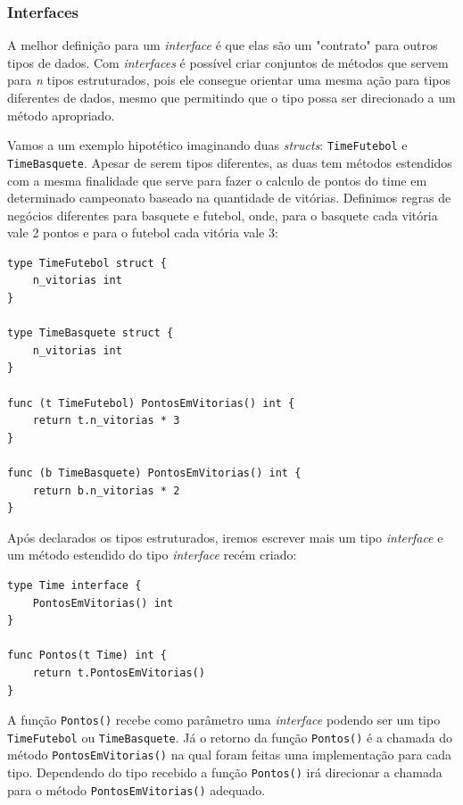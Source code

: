 \documentclass{SBCbookchapter}
\begin{document}
\subsubsection{Interfaces}

A melhor definição para um \textit{interface} é que elas são um "contrato" para outros tipos de dados. Com \textit{interfaces} é possível criar conjuntos de métodos que servem para \textit{n} tipos estruturados, pois ele consegue orientar uma mesma ação para tipos diferentes de dados, mesmo que permitindo que o tipo possa ser direcionado a um método apropriado.

Vamos a um exemplo hipotético imaginando duas \textit{structs}: \texttt{TimeFutebol} e \texttt{TimeBasquete}. Apesar de serem tipos diferentes, as duas tem métodos estendidos com a mesma finalidade que serve para fazer o calculo de pontos do time em determinado campeonato baseado na quantidade de vitórias. Definimos regras de negócios diferentes para basquete e futebol, onde, para o basquete cada vitória vale 2 pontos e para o futebol cada vitória vale 3:

\begin{lstlisting}
type TimeFutebol struct {
	n_vitorias int
}

type TimeBasquete struct {
	n_vitorias int
}

func (t TimeFutebol) PontosEmVitorias() int {
	return t.n_vitorias * 3
}

func (b TimeBasquete) PontosEmVitorias() int {
	return b.n_vitorias * 2
}
\end{lstlisting}

Após declarados os tipos estruturados, iremos escrever mais um tipo \textit{interface} e um método estendido do tipo \textit{interface} recém criado:

\begin{lstlisting}
type Time interface {
	PontosEmVitorias() int
}

func Pontos(t Time) int {
	return t.PontosEmVitorias()
}
\end{lstlisting}

A função \texttt{Pontos()} recebe como parâmetro uma \textit{interface} podendo ser um tipo \texttt{TimeFutebol} ou \texttt{TimeBasquete}. Já o retorno da função \texttt{Pontos()} é a chamada do método \texttt{PontosEmVitorias()} na qual foram feitas uma implementação para cada tipo. Dependendo do tipo recebido a função \texttt{Pontos()} irá direcionar a chamada para o método \texttt{PontosEmVitorias()} adequado.
\end{document}
